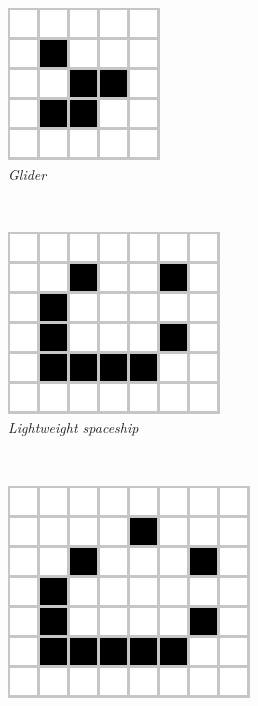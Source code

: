\documentclass[../proyecto.tex]{memoir}
\begin{document}
\begin{figure}[H]
	\centering
	\begin{subfigure}[b]{0.3\linewidth} 
        \centering
        \includegraphics[height=.45\linewidth]{./images/glider.png}
        \caption{\textit{Glider}}
        \label{fig:glider}
    \end{subfigure}
    \ 
	\begin{subfigure}[b]{0.3\linewidth} 
        \centering
        \includegraphics[height=0.45\linewidth]{./images/lightweightspaceship.png}
        \caption{\textit{Lightweight spaceship}}
        \label{fig:lightweightspaceship}
    \end{subfigure}
    \
	\begin{subfigure}[b]{0.3\linewidth} 
        \centering
        \includegraphics[height=0.45\linewidth]{./images/middleweightspaceship.png}

\end{subfigure}
\end{figure}
\end{document}
